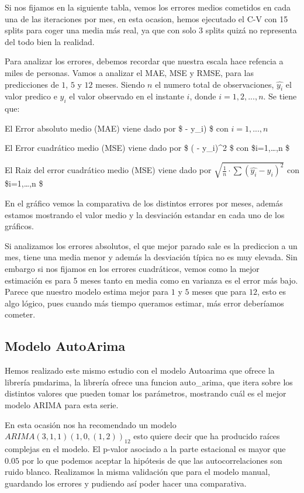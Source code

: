 \documentclass[11pt]{article}
\begin{document}
Si nos fijamos en la siguiente tabla, vemos los errores medios cometidos
en cada una de las iteraciones por mes, en esta ocasion, hemos ejecutado
el C-V con 15 splits para coger una media más real, ya que con solo 3
splits quizá no representa del todo bien la realidad.

    Para analizar los errores, debemos recordar que nuestra escala hace
refencia a miles de personas. Vamos a analizar el MAE, MSE y RMSE, para
las predicciones de \(1\), \(5\) y \(12\) meses. Siendo \(n\) el numero
total de observaciones, \(\hat{y_i}\) el valor predico e \(y_i\) el
valor observado en el instante \(i\), donde \(i=1,2,...,n\). Se tiene
que:

El Error absoluto medio (MAE) viene dado por \$ 
\cdot \sum \textbar{} - y\_i)\textbar{} \$ con \(i=1,...,n\)

El Error cuadrático medio (MSE) viene dado por \$ 
\cdot \sum ( - y\_i)\^{}2 \$ con \$i=1,\ldots,n \$

El Raiz del error cuadrático medio (MSE) viene dado por
\(\sqrt{ \frac{1}{n} \cdot \sum (\hat{y_i} - y_i)^2 }\) con
\$i=1,\ldots,n \$

    En el gráfico vemos la comparativa de los distintos errores por meses,
además estamos mostrando el valor medio y la desviación estandar en cada
uno de los gráficos.

Si analizamos los errores absolutos, el que mejor parado sale es la
prediccion a un mes, tiene una media menor y además la desviación típica
no es muy elevada. Sin embargo si nos fijamos en los errores
cuadráticos, vemos como la mejor estimación es para 5 meses tanto en
media como en varianza es el error más bajo. Parece que nuestro modelo
estima mejor para \(1\) y \(5\) meses que para \(12\), esto es algo
lógico, pues cuando más tiempo queramos estimar, más error deberíamos
cometer.

    \hypertarget{modelo-autoarima}{%
\subsection{Modelo AutoArima}\label{modelo-autoarima}}

    Hemos realizado este mismo estudio con el modelo Autoarima que ofrece la
librería pmdarima, la librería ofrece una funcion auto\_arima, que itera
sobre los distintos valores que pueden tomar los parámetros, mostrando
cuál es el mejor modelo ARIMA para esta serie.

    En esta ocasión nos ha recomendado un modelo
\(ARIMA(3,1,1)(1,0,(1,2))_{12}\) esto quiere decir que ha producido
raíces complejas en el modelo. El p-valor asociado a la parte estacional
es mayor que \(0.05\) por lo que podemos aceptar la hipótesis de que las
autocorrelaciones son ruido blanco. Realizamos la misma validación que
para el modelo manual, guardando los errores y pudiendo así poder hacer
una comparativa.
\end{document}
